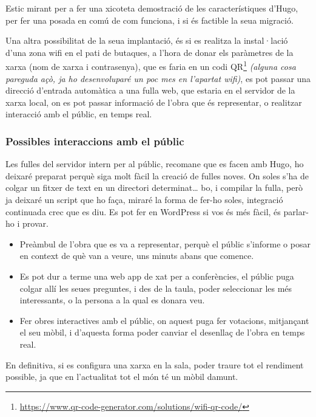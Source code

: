 \documentclass[
  10pt,
]{krantz}
\DeclareRobustCommand{\href}[2]{#2\footnote{\url{#1}}}
\begin{document}
Estic mirant per a fer una xicoteta demostració de les característiques d'Hugo, per fer una posada en comú de com funciona, i si és factible la seua migració.

Una altra possibilitat de la seua implantació, és si es realitza la instal·lació d'una zona wifi en el pati de butaques, a l'hora de donar els paràmetres de la xarxa (nom de xarxa i contrasenya), que es faria en un codi \href{https://www.qr-code-generator.com/solutions/wifi-qr-code/}{QR} \emph{(alguna cosa pareguda açò, ja ho desenvoluparé un poc mes en l'apartat wifi)}, es pot passar una direcció d'entrada automàtica a una fulla web, que estaria en el servidor de la xarxa local, on es pot passar informació de l'obra que és representar, o realitzar interacció amb el públic, en temps real.

\hypertarget{possibles-interaccions-amb-el-puxfablic}{%
\subsubsection{Possibles interaccions amb el públic}\label{possibles-interaccions-amb-el-puxfablic}}

Les fulles del servidor intern per al públic, recomane que es facen amb Hugo, ho deixaré preparat perquè siga molt fàcil la creació de fulles noves. On soles s'ha de colgar un fitxer de text en un directori determinat\ldots{} bo, i compilar la fulla, però ja deixaré un script que ho faça, miraré la forma de fer-ho soles, integració continuada crec que es diu. Es pot fer en WordPress si vos és més fàcil, és parlar-ho i provar.

\begin{itemize}
\item
  Preàmbul de l'obra que es va a representar, perquè el públic s'informe o posar en context de què van a veure, uns minuts abans que comence.
\item
  Es pot dur a terme una web app de xat per a conferències, el públic puga colgar allí les seues preguntes, i des de la taula, poder seleccionar les més interessants, o la persona a la qual es donara veu.
\item
  Fer obres interactives amb el públic, on aquest puga fer votacions, mitjançant el seu mòbil, i d'aquesta forma poder canviar el desenllaç de l'obra en temps real.
\end{itemize}

En definitiva, si es configura una xarxa en la sala, poder traure tot el rendiment possible, ja que en l'actualitat tot el món té un mòbil damunt.
\end{document}
